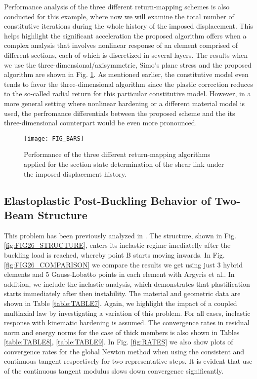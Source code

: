 Performance analysis of the three different return-mapping schemes is also 
conducted for this example, where now we will examine the total number of 
constitutive iterations during the whole history of the imposed displacement. 
This helps highlight the significant acceleration the proposed algorithm offers 
when a complex analysis that involves nonlinear response of an element 
comprised of different sections, each of which is discretized in several 
layers. The results when we use the three-dimensional/axisymmetric, Simo's 
plane stress and the proposed algorithm are shown in Fig. \ref{fig:FIG_BARS}. 
As mentioned earlier, the constitutive model even tends to favor the 
three-dimensional algorithm since the plastic correction reduces to the 
so-called radial return for this particular constitutive model. However, in a 
more general setting where nonlinear hardening or a different material model is 
used, the perfromance differentials between the proposed scheme and the its 
three-dimensional counterpart would be even more pronounced.

 \begin{figure}[t]
 	\centering
 	\texttt{[image: FIG\_BARS]}
 	\caption{Performance of the three different return-mapping algorithms 
 	applied for the section state determination of the shear link under the 
 	imposed displacement history.}
 	\label{fig:FIG_BARS}
 \end{figure}
\subsection{Elastoplastic Post-Buckling Behavior of Two-Beam Structure}

This problem has been previously analyzed in \cite{Argyris1982,Ridha1971}. The 
structure, shown in Fig.\ref{fig:FIG26_STRUCTURE}, enters its inelastic regime 
imediatelly after the buckling 
load is reached, whereby point B starts moving inwards. In 
Fig.\ref{fig:FIG26_COMPARISON} we compare the 
results we get using just 3 hybrid elements and 5 Gauss-Lobatto points in each 
element with Argyris et al.\cite{Argyris1982}. In addition, we include the 
inelastic analysis, which demonstrates that plastification starts immediately 
after then instability. The material and geometric data are shown in 
Table \ref{table:TABLE7}. Again, we highlight the impact of a coupled 
multiaxial law by 
investigating a variation of this problem. For all cases, inelastic response 
with kinematic hardening is assumed. The convergence rates in residual norm and 
energy norms for the case of thick members is also shown in Tables 
\ref{table:TABLE8}, \ref{table:TABLE9}. In Fig. \ref{fig:RATES} we also show 
plots of convergence rates for the global Newton method when using the 
consistent and continuous tangent respectively for two representative steps. It 
is evident that use of the continuous tangent modulus slows down convergence 
significantly.

